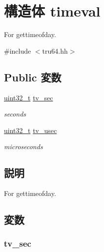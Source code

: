 \hypertarget{structTru64_1_1timeval}{
\section{構造体 timeval}
\label{structTru64_1_1timeval}
}


For gettimeofday.  


{\ttfamily \#include $<$tru64.hh$>$}\subsection*{Public 変数}
\begin{DoxyCompactItemize}
\item 
\hyperlink{Type_8hh_a435d1572bf3f880d55459d9805097f62}{uint32\_\-t} \hyperlink{structTru64_1_1timeval_a114f22e1578cd276434d684f3579bb1c}{tv\_\-sec}
\begin{DoxyCompactList}\small\item\em seconds \item\end{DoxyCompactList}\item 
\hyperlink{Type_8hh_a435d1572bf3f880d55459d9805097f62}{uint32\_\-t} \hyperlink{structTru64_1_1timeval_a992cb17cdfd7acb0c5088ffea2054731}{tv\_\-usec}
\begin{DoxyCompactList}\small\item\em microseconds \item\end{DoxyCompactList}\end{DoxyCompactItemize}


\subsection{説明}
For gettimeofday. 

\subsection{変数}
\hypertarget{structTru64_1_1timeval_a114f22e1578cd276434d684f3579bb1c}{
\subsubsection[{tv\_\-sec}]{ {\bf tv\_\-sec}}}
\label{structTru64_1_1timeval_a114f22e1578cd276434d684f3579bb1c}


